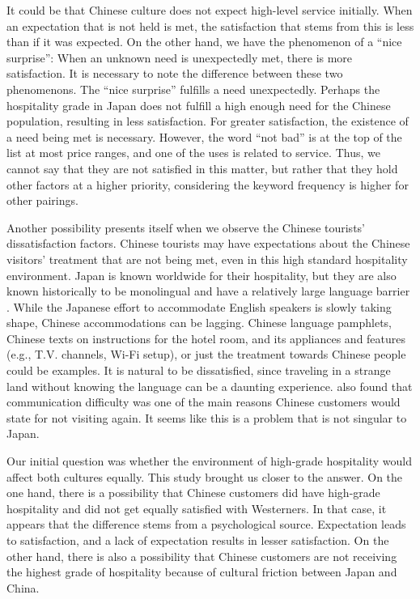 \documentclass[smallextended,natbib]{svjour3}       %
\begin{document}
    It could be that Chinese culture does not expect high-level service initially. When an expectation that is not held is met, the satisfaction that stems from this is less than if it was expected. On the other hand, we have the phenomenon of a ``nice surprise'': When an unknown need is unexpectedly met, there is more satisfaction. It is necessary to note the difference between these two phenomenons. The ``nice surprise'' fulfills a need unexpectedly. Perhaps the hospitality grade in Japan does not fulfill a high enough need for the Chinese population, resulting in less satisfaction. For greater satisfaction, the existence of a need being met is necessary. However, the word ``not bad'' is at the top of the list at most price ranges, and one of the uses is related to service. Thus, we cannot say that they are not satisfied in this matter, but rather that they hold other factors at a higher priority, considering the keyword frequency is higher for other pairings.

    Another possibility presents itself when we observe the Chinese tourists’ dissatisfaction factors. Chinese tourists may have expectations about the Chinese visitors' treatment that are not being met, even in this high standard hospitality environment. Japan is known worldwide for their hospitality, but they are also known historically to be monolingual and have a relatively large language barrier \cite[][]{heinrich2012making,coulmas2002japan}. While the Japanese effort to accommodate English speakers is slowly taking shape, Chinese accommodations can be lagging. Chinese language pamphlets, Chinese texts on instructions for the hotel room, and its appliances and features (e.g., T.V. channels, Wi-Fi setup), or just the treatment towards Chinese people could be examples. It is natural to be dissatisfied, since traveling in a strange land without knowing the language can be a daunting experience. \cite{ryan2001} also found that communication difficulty was one of the main reasons Chinese customers would state for not visiting again. It seems like this is a problem that is not singular to Japan.

    Our initial question was whether the environment of high-grade hospitality would affect both cultures equally. This study brought us closer to the answer. On the one hand, there is a possibility that Chinese customers did have high-grade hospitality and did not get equally satisfied with Westerners. In that case, it appears that the difference stems from a psychological source. Expectation leads to satisfaction, and a lack of expectation results in lesser satisfaction. On the other hand, there is also a possibility that Chinese customers are not receiving the highest grade of hospitality because of cultural friction between Japan and China.
\end{document}
